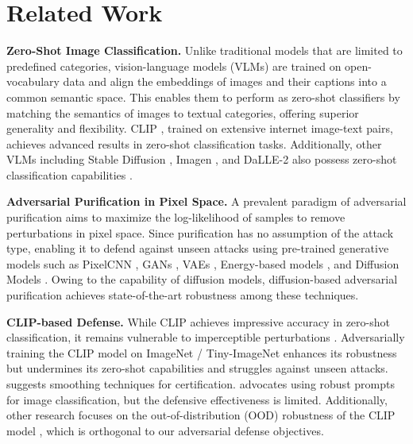 \section{Related Work}
\textbf{Zero-Shot Image Classification.}
Unlike traditional models that are limited to predefined categories, vision-language models (VLMs) are trained on open-vocabulary data and align the embeddings of images and their captions into a common semantic space. This enables them to perform as zero-shot classifiers by matching the semantics of images to textual categories, offering superior generality and flexibility. CLIP \citep{radford2021learning}, trained on extensive internet image-text pairs, achieves advanced results in zero-shot classification tasks. Additionally, other VLMs including Stable Diffusion \citep{rombach2022high}, Imagen \citep{saharia2022palette}, and DaLLE-2 \citep{ramesh2022hierarchical} also possess zero-shot classification capabilities \citep{li2023your, clark2024text}.

\textbf{Adversarial Purification in Pixel Space.}
A prevalent paradigm of adversarial purification aims to maximize the log-likelihood of samples to remove perturbations in pixel space. Since purification has no assumption of the attack type, enabling it to defend against unseen attacks using pre-trained generative models such as PixelCNN \citep{song2017pixeldefend}, GANs \citep{samangouei2018defense}, VAEs \citep{li2020defense}, Energy-based models \citep{hill2020stochastic, yoon2021adversarial}, and Diffusion Models \citep{nie2022diffusion, chen2023robust, zhang2025causaldiff}. Owing to the capability of diffusion models, diffusion-based adversarial purification achieves state-of-the-art robustness among these techniques.



\textbf{CLIP-based Defense.}
While CLIP achieves impressive accuracy in zero-shot classification, it remains vulnerable to imperceptible perturbations \citep{Fort2021CLIPadversarial, mao2022understanding}. Adversarially training the CLIP model on ImageNet / Tiny-ImageNet \citep{schlarmann2024robust, mao2022understanding, wang2024pre} enhances its robustness but undermines its zero-shot capabilities and struggles against unseen attacks. \citet{choi2025adversarial} suggests smoothing techniques for certification. \citet{li2024one} advocates using robust prompts for image classification, but the defensive effectiveness is limited. Additionally, other research focuses on the out-of-distribution (OOD) robustness of the CLIP model \citep{tu2024closer, galindounderstanding}, which is orthogonal to our adversarial defense objectives.

%